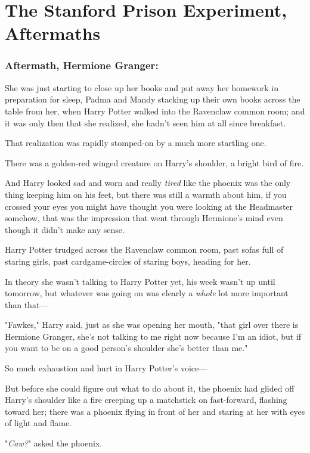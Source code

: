 \chapter{The Stanford Prison Experiment, Aftermaths}

\subsection{Aftermath, Hermione Granger:}

She was just starting to close up her books and put away her homework in 
preparation for sleep, Padma and Mandy stacking up their own books across the 
table from her, when Harry Potter walked into the Ravenclaw common room; and it 
was only then that she realized, she hadn't seen him at all since breakfast.

That realization was rapidly stomped-on by a much more startling one.

There was a golden-red winged creature on Harry's shoulder, a bright bird of 
fire.

And Harry looked sad and worn and really \emph{tired} like the phoenix was the 
only thing keeping him on his feet, but there was still a warmth about him, if 
you crossed your eyes you might have thought you were looking at the Headmaster 
somehow, that was the impression that went through Hermione's mind even though 
it didn't make any sense.

Harry Potter trudged across the Ravenclaw common room, past sofas full of 
staring girls, past cardgame-circles of staring boys, heading for her.

In theory she wasn't talking to Harry Potter yet, his week wasn't up until 
tomorrow, but whatever was going on was clearly a \emph{whole} lot more 
important than that---

"Fawkes," Harry said, just as she was opening her mouth, "that girl over there 
is Hermione Granger, she's not talking to me right now because I'm an idiot, 
but if you want to be on a good person's shoulder she's better than me."

So much exhaustion and hurt in Harry Potter's voice---

But before she could figure out what to do about it, the phoenix had glided off 
Harry's shoulder like a fire creeping up a matchstick on fast-forward, flashing 
toward her; there was a phoenix flying in front of her and staring at her with 
eyes of light and flame.

"\emph{Caw?}" asked the phoenix.

